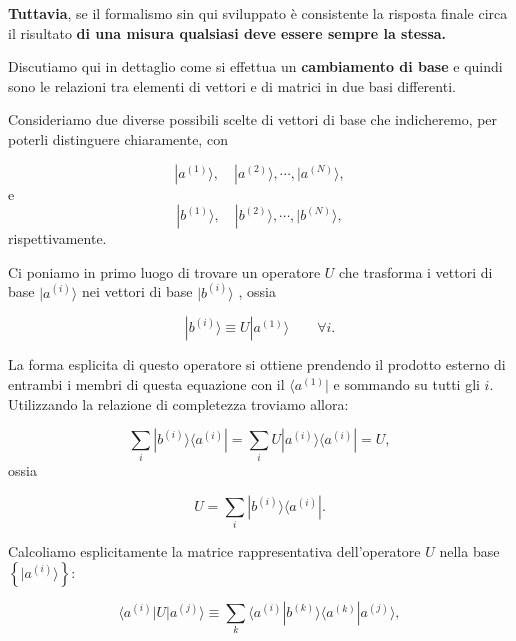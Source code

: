 \textbf{Tuttavia}, se il formalismo sin qui sviluppato è consistente la risposta finale circa il risultato \textbf{di una misura qualsiasi deve essere sempre la stessa.}

Discutiamo qui in dettaglio come si effettua un \textbf{cambiamento di base} e quindi sono le relazioni tra elementi di vettori e di matrici in due basi differenti.

Consideriamo due diverse possibili scelte di vettori di base che indicheremo, per poterli distinguere chiaramente, con 

\begin{equation}
| a^{(1)} \rangle , \quad  | a^{(2)} \rangle , \cdots , | a^{(N)} \rangle ,
\end{equation}
e
\begin{equation}
| b^{(1)} \rangle , \quad | b^{(2)} \rangle , \cdots , | b^{(N)} \rangle ,
\end{equation}
rispettivamente.

Ci poniamo in primo luogo di trovare un operatore $U$ che trasforma i vettori di base $| a^{(i)} \rangle$ nei vettori di base $| b^{(i)} \rangle $ , ossia 

\begin{equation}
| b^{(i)} \rangle \equiv U | a^{(1)} \rangle \qquad \forall i .
\end{equation}

La forma esplicita di questo operatore si ottiene prendendo il prodotto esterno di entrambi i membri di questa equazione con il $\langle a^{(1)}| $ e sommando su tutti gli $i$. Utilizzando la relazione di completezza troviamo allora:

\begin{equation}
\sum \limits_{i} | b^{(i)} \rangle \langle a^{(i)} |  = \sum \limits_{i} U | a^{(i)} \rangle \langle a^{(i)} |  = U ,
\end{equation}
 ossia
 
\begin{equation}
U = \sum \limits_{i} | b^{(i)} \rangle \langle a^{(i)} | .
\end{equation}

Calcoliamo esplicitamente la matrice rappresentativa dell'operatore $U$ nella base $\left\{ | a^{(i)} \rangle    \right\} $:

\begin{equation}
\langle a^{(i)} | U | a^{(j)} \rangle \equiv \sum \limits_{k} \langle a^{(i)} | b^{(k)} \rangle  \langle a^{(k)} | a^{(j)} \rangle  ,
\end{equation}

